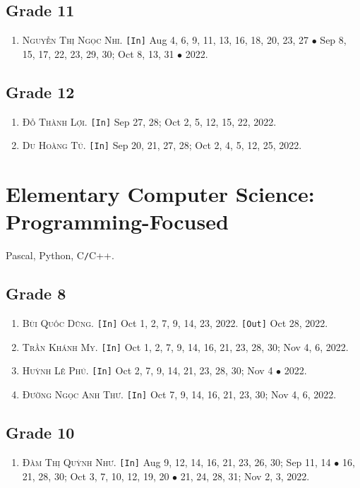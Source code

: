 \documentclass{article}
\numberwithin{equation}{section}
\begin{document}
\subsection{Grade 11}
\begin{enumerate}
	\item \textsc{Nguyễn Thị Ngọc Nhi.} \texttt{[In]} Aug 4, 6, 9, 11, 13, 16, 18, 20, 23, 27 $\bullet$ Sep 8, 15, 17, 22, 23, 29, 30; Oct 8, 13, 31 $\bullet$ 2022.
\end{enumerate}

\subsection{Grade 12}
\begin{enumerate}
	\item \textsc{Đỗ Thành Lợi.} \texttt{[In]} Sep 27, 28; Oct 2, 5, 12, 15, 22, 2022.
	\item \textsc{Du Hoàng Tú.} \texttt{[In]} Sep 20, 21, 27, 28; Oct 2, 4, 5, 12, 25, 2022.
\end{enumerate}


\section{Elementary Computer Science: Programming-Focused}
Pascal, Python, C\texttt{/}C++.

\subsection{Grade 8}
\begin{enumerate}
	\item \textsc{Bùi Quốc Dũng.} \texttt{[In]} Oct 1, 2, 7, 9, 14, 23, 2022. \texttt{[Out]} Oct 28, 2022.
	\item \textsc{Trần Khánh My.} \texttt{[In]} Oct 1, 2, 7, 9, 14, 16, 21, 23, 28, 30; Nov 4, 6, 2022.
	\item \textsc{Huỳnh Lê Phú.} \texttt{[In]} Oct 2, 7, 9, 14, 21, 23, 28, 30; Nov 4 $\bullet$ 2022.
	\item \textsc{Đường Ngọc Anh Thư.} \texttt{[In]} Oct 7, 9, 14, 16, 21, 23, 30; Nov 4, 6, 2022.
\end{enumerate}

\subsection{Grade 10}
\begin{enumerate}
	\item \textsc{Đàm Thị Quỳnh Như.} \texttt{[In]} Aug 9, 12, 14, 16, 21, 23, 26, 30; Sep 11, 14 $\bullet$ 16, 21, 28, 30; Oct 3, 7, 10, 12, 19, 20 $\bullet$ 21, 24, 28, 31; Nov 2, 3, 2022.
\end{enumerate}
\end{document}
